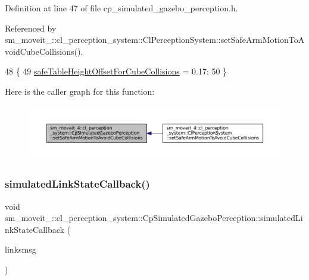 Definition at line 47 of file cp\+\_\+simulated\+\_\+gazebo\+\_\+perception.\+h.



Referenced by sm\+\_\+moveit\+\_\+::cl\+\_\+perception\+\_\+system\+::\+Cl\+Perception\+System\+::set\+Safe\+Arm\+Motion\+To\+Avoid\+Cube\+Collisions().


\begin{DoxyCode}
48             \{
49                  \hyperlink{classsm__moveit__4_1_1cl__perception__system_1_1CpSimulatedGazeboPerception_a6b6bafbddde1f72c81bf54aa75872151}{safeTableHeightOffsetForCubeCollisions} = 0.17;
50             \}
\end{DoxyCode}
Here is the caller graph for this function\+:
\nopagebreak
\begin{figure}[H]
\begin{center}
\leavevmode
\includegraphics[width=350pt]{classsm__moveit__4_1_1cl__perception__system_1_1CpSimulatedGazeboPerception_af42b5a4e239fcac98a222c34115c9bc0_icgraph}
\end{center}
\end{figure}
\mbox{\label{classsm__moveit__4_1_1cl__perception__system_1_1CpSimulatedGazeboPerception_a7914ffd20518c866a8a1e11254589d12}} 
\subsubsection{\texorpdfstring{simulated\+Link\+State\+Callback()}{simulatedLinkStateCallback()}}
{\footnotesize\ttfamily void sm\+\_\+moveit\+\_\+::cl\+\_\+perception\+\_\+system\+::\+Cp\+Simulated\+Gazebo\+Perception\+::simulated\+Link\+State\+Callback (\begin{DoxyParamCaption}\item[{const gazebo\+\_\+msgs\+::\+Link\+States \&}]{linksmsg }\end{DoxyParamCaption})\hspace{0.3cm}{\ttfamily [inline]}}



